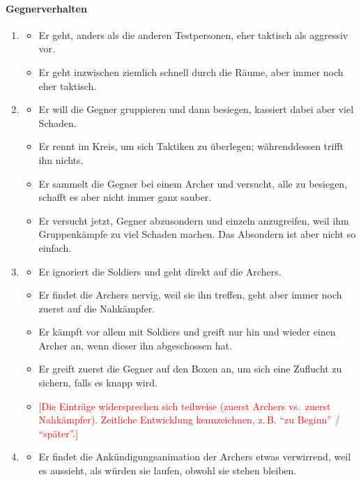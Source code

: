 \documentclass[../Main.tex]{subfiles}
\begin{document}
\paragraph{Gegnerverhalten}
\begin{enumerate}[label=\textbf{B\arabic*}, leftmargin=1.5cm, itemsep=0.8em]
\item
\begin{itemize}[nosep]
\item Er geht, anders als die anderen Testpersonen, eher taktisch als aggressiv vor.
\item Er geht inzwischen ziemlich schnell durch die Räume, aber immer noch eher taktisch.
\end{itemize}
\item
\begin{itemize}[nosep]
\item Er will die Gegner gruppieren und dann besiegen, kassiert dabei aber viel Schaden.
\item Er rennt im Kreis, um sich Taktiken zu überlegen; währenddessen trifft ihn nichts.
\item Er sammelt die Gegner bei einem Archer und versucht, alle zu besiegen, schafft es aber nicht immer ganz sauber.
\item Er versucht jetzt, Gegner abzusondern und einzeln anzugreifen, weil ihm Gruppenkämpfe zu viel Schaden machen. Das Absondern ist aber nicht so einfach.
\end{itemize}
\item
\begin{itemize}[nosep]
\item Er ignoriert die Soldiers und geht direkt auf die Archers.
\item Er findet die Archers nervig, weil sie ihn treffen, geht aber immer noch zuerst auf die Nahkämpfer.
\item Er kämpft vor allem mit Soldiers und greift nur hin und wieder einen Archer an, wenn dieser ihn abgeschossen hat.
\item Er greift zuerst die Gegner auf den Boxen an, um sich eine Zuflucht zu sichern, falls es knapp wird.
\item \textcolor{red}{[Die Einträge widersprechen sich teilweise (zuerst Archers vs.\ zuerst Nahkämpfer). Zeitliche Entwicklung kennzeichnen, z.\,B. \enquote{zu Beginn} / \enquote{später}.]}
\end{itemize}
\item
\begin{itemize}[nosep]
\item Er findet die Ankündigungsanimation der Archers etwas verwirrend, weil es aussieht, als würden sie laufen, obwohl sie stehen bleiben.

\end{itemize}
\end{enumerate}
\end{document}
